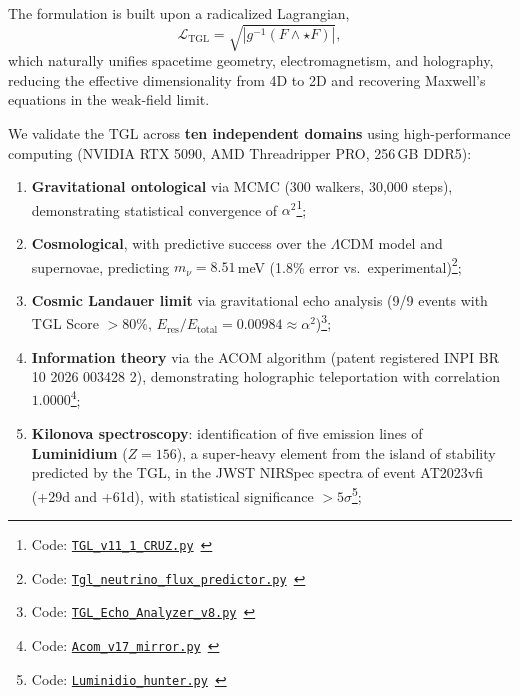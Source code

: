 \documentclass[12pt,a4paper,twoside]{article}
\newcommand{\alphaii}{\alpha^{2}}
\newcommand{\Ltgl}{\mathcal{L}_{\text{TGL}}}
\begin{document}
The formulation is built upon a radicalized Lagrangian,
\begin{equation*}
\Ltgl = \sqrt{\left|g^{-1}(F \wedge \star F)\right|},
\end{equation*}
which naturally unifies spacetime geometry, electromagnetism, and holography, reducing the effective dimensionality from 4D to 2D and recovering Maxwell's equations in the weak-field limit.

We validate the TGL across \textbf{ten independent domains} using high-performance computing (NVIDIA RTX 5090, AMD Threadripper PRO, 256\,GB DDR5):

\begin{enumerate}[label=(\arabic*),nosep]
\item \textbf{Gravitational ontological} via MCMC (300 walkers, 30,000 steps), demonstrating statistical convergence of $\alphaii$\footnote{Code: \texttt{\href{https://github.com/rotolimiguel-iald/the_boundary/blob/main/TGL_v11_1_CRUZ.py}{TGL\_v11\_1\_CRUZ.py}}\ \cite{Miguel2026GitHub}};
\item \textbf{Cosmological}, with predictive success over the $\Lambda$CDM model and supernovae, predicting $m_\nu = 8.51$\,meV (1.8\% error vs.\ experimental)\footnote{Code: \texttt{\href{https://github.com/rotolimiguel-iald/the_boundary/blob/main/Tgl_neutrino_flux_predictor.py}{Tgl\_neutrino\_flux\_predictor.py}}\ \cite{Miguel2026GitHub}};
\item \textbf{Cosmic Landauer limit} via gravitational echo analysis (9/9 events with TGL Score $> 80\%$, $E_{\text{res}}/E_{\text{total}} = 0.00984 \approx \alphaii$)\footnote{Code: \texttt{\href{https://github.com/rotolimiguel-iald/the_boundary/blob/main/TGL_Echo_Analyzer_v8.py}{TGL\_Echo\_Analyzer\_v8.py}}\ \cite{Miguel2026GitHub}}; 
\item \textbf{Information theory} via the ACOM algorithm (patent registered INPI BR 10 2026 003428 2), demonstrating holographic teleportation with correlation $1.0000$\footnote{Code: \texttt{\href{https://github.com/rotolimiguel-iald/the_boundary/blob/main/Acom_v17_mirror.py}{Acom\_v17\_mirror.py}}\ \cite{Miguel2026GitHub}}; 
\item \textbf{Kilonova spectroscopy}: identification of five emission lines of \textbf{Luminidium} ($Z = 156$), a super-heavy element from the island of stability predicted by the TGL, in the JWST NIRSpec spectra of event AT2023vfi (+29d and +61d), with statistical significance $> 5\sigma$\footnote{Code: \texttt{\href{https://github.com/rotolimiguel-iald/the_boundary/blob/main/Luminidio_hunter.py}{Luminidio\_hunter.py}}\ \cite{Miguel2026GitHub}}; 

\end{enumerate}
\end{document}
